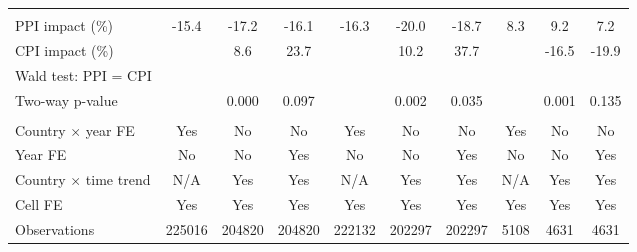 {\begin{tabular}{l*{9}{c}}
\hline \\ PPI impact (\%)&       -15.4         &       -17.2         &       -16.1         &       -16.3         &       -20.0         &       -18.7         &         8.3         &         9.2         &         7.2         \\
CPI impact (\%)     &                     &         8.6         &        23.7         &                     &        10.2         &        37.7         &                     &       -16.5         &       -19.9         \\
Wald test: PPI = CPI&                     &                     &                     &                     &                     &                     &                     &                     &                     \\
\hspace{15pt} Two-way p-value&                     &       0.000         &       0.097         &                     &       0.002         &       0.035         &                     &       0.001         &       0.135         \\
\hline \\ Country $\times$ year FE&         Yes         &          No         &          No         &         Yes         &          No         &          No         &         Yes         &          No         &          No         \\
Year FE             &          No         &          No         &         Yes         &          No         &          No         &         Yes         &          No         &          No         &         Yes         \\
Country $\times$ time trend&         N/A         &         Yes         &         Yes         &         N/A         &         Yes         &         Yes         &         N/A         &         Yes         &         Yes         \\
Cell FE             &         Yes         &         Yes         &         Yes         &         Yes         &         Yes         &         Yes         &         Yes         &         Yes         &         Yes         \\
Observations        &      225016         &      204820         &      204820         &      222132         &      202297         &      202297         &        5108         &        4631         &        4631         \\
\hline\hline
\end{tabular}
}
